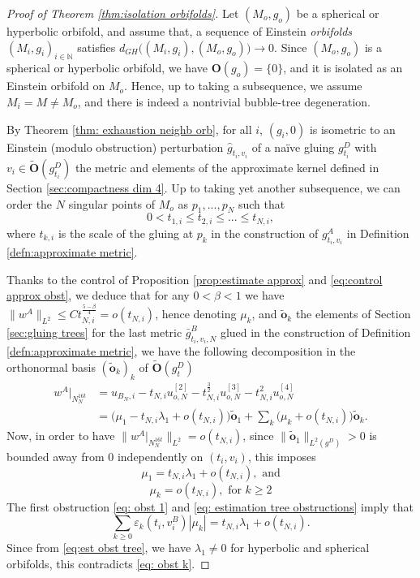 \documentclass[11pt,reqno]{amsart}
\numberwithin{equation}{section}
\theoremstyle{definition}
\theoremstyle{remark}
\begin{document}
\begin{proof}[Proof of Theorem \ref{thm:isolation orbifolds}]

Let $(M_o,g_o)$ be a spherical or hyperbolic orbifold, and assume that, a sequence of Einstein \textit{orbifolds} $(M_i,g_i)_{i\in\mathbb{N}}$ satisfies
$ d_{GH}\big((M_i,g_i),(M_o,g_o)\big) \to 0.$
Since $(M_o,g_o)$ is a spherical or hyperbolic orbifold, we have $\mathbf{O}(g_o) = \{0\}$, and it is isolated as an Einstein orbifold on $M_o$. Hence, up to taking a subsequence, we assume $M_i=M\neq M_o$, and there is indeed a nontrivial bubble-tree degeneration. 

By Theorem \ref{thm: exhaustion neighb orb}, for all $i$, $(g_i,0)$ is isometric to an Einstein (modulo obstruction) perturbation $\hat{g}_{t_i,v_i}$ of a naïve gluing $g^D_{t_i}$ with $v_i\in \tilde{\mathbf{O}}(g^D_{t_i})$ the metric and elements of the approximate kernel defined in Section \ref{sec:compactness dim 4}. Up to taking yet another subsequence, we can order the $N$ singular points of $M_o$ as $p_1,...,p_N$ such that
$$0<t_{1,i}\leqslant t_{2,i} \leqslant... \leqslant t_{N,i},$$
where $t_{k,i}$ is the scale of the gluing at $p_k$ in the construction of $g^A_{t_i,v_i}$ in Definition \ref{defn:approximate metric}.

    Thanks to the control of Proposition \ref{prop:estimate approx} and \eqref{eq:control approx obst}, we deduce that for any $0<\beta<1$ we have $\|w^A\|_{L^2}\leqslant C t_{N,i}^{\frac{5-\beta}4} = o(t_{N,i})$, hence denoting $\mu_k$, and $\tilde{\mathbf{o}}_k$ the elements of Section \ref{sec:gluing trees} for the last metric $\bar{g}^B_{t_i,v_i,N}$ glued in the construction of Definition \ref{defn:approximate metric}, we have the following decomposition in the orthonormal basis $(\tilde{\mathbf{o}}_k)_k$ of $\tilde{\mathbf{O}}(g^D_t)$ 
\begin{align*}
    w^A|_{N_N^{16t}}&= u_{B_N,i} - t_{N,i} u_{o,N}^{[2]} -t_{N,i}^\frac32 u_{o,N}^{[3]}-t_{N,i}^2 u_{o,N}^{[4]}\\
    &= \big(\mu_1-t_{N,i}\lambda_1 + o(t_{N,i})\big) \tilde{\mathbf{o}}_1 + \sum_k\big(\mu_k+o(t_{N,i})\big)\tilde{\mathbf{o}}_k.
\end{align*}
Now, in order to have $\|w^A|_{N_N^{16t}}\|_{L^2}=o(t_{N,i})$, since $\|\tilde{\mathbf{o}}_1\|_{L^2(g^D)}>0$ is bounded away from $0$ independently on $(t_i,v_i)$, this imposes 
    \begin{equation}\label{eq: obst 1}
        \mu_1 = t_{N,i}\lambda_1 + o(t_{N,i}), \text{ and}
    \end{equation}
    \begin{equation}\label{eq: obst k}
        \mu_k = o(t_{N,i}), \text{ for } k\geqslant2
    \end{equation}
    The first obstruction \eqref{eq: obst 1} and \eqref{eq: estimation tree obstructions} imply that 
    $$\sum_{k\geqslant 0}\varepsilon_k(t_i,v_i^B)  |\mu_k| = t_{N,i}\lambda_1 + o(t_{N,i}).$$
    Since from \eqref{eq:est obst tree}, we have $\lambda_1 \neq 0$ for hyperbolic and spherical orbifolds, this contradicts \eqref{eq: obst k}.
\end{proof}
\end{document}
